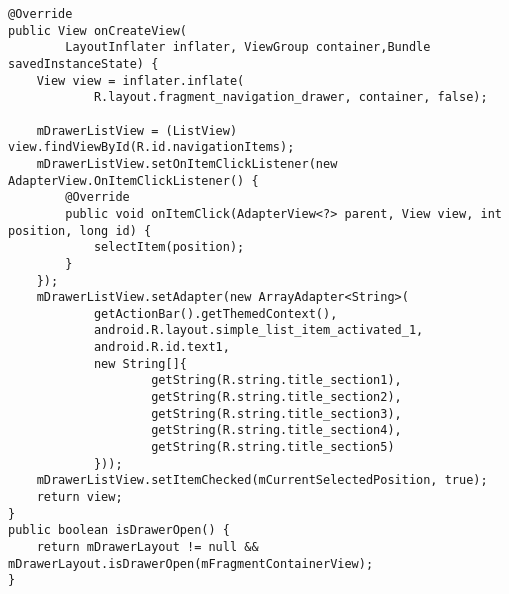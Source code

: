 \begin{lstlisting}[style=custom_JAVA]
@Override
public View onCreateView(
		LayoutInflater inflater, ViewGroup container,Bundle savedInstanceState) {
    View view = inflater.inflate(
            R.layout.fragment_navigation_drawer, container, false);

    mDrawerListView = (ListView) view.findViewById(R.id.navigationItems);
    mDrawerListView.setOnItemClickListener(new AdapterView.OnItemClickListener() {
        @Override
        public void onItemClick(AdapterView<?> parent, View view, int position, long id) {
            selectItem(position);
        }
    });
    mDrawerListView.setAdapter(new ArrayAdapter<String>(
            getActionBar().getThemedContext(),
            android.R.layout.simple_list_item_activated_1,
            android.R.id.text1,
            new String[]{
                    getString(R.string.title_section1),
                    getString(R.string.title_section2),
                    getString(R.string.title_section3),
                    getString(R.string.title_section4),
                    getString(R.string.title_section5)
            }));
    mDrawerListView.setItemChecked(mCurrentSelectedPosition, true);
    return view;
}
public boolean isDrawerOpen() {
    return mDrawerLayout != null && mDrawerLayout.isDrawerOpen(mFragmentContainerView);
}
\end{lstlisting}